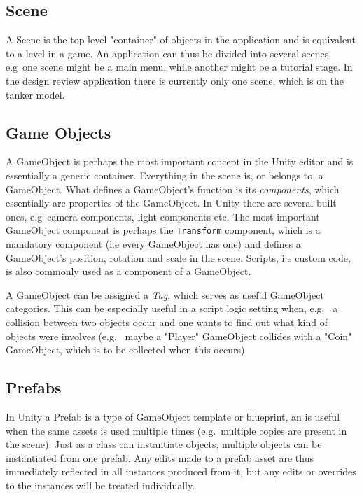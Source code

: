 \subsection{Scene}
A Scene is the top level "container" of objects in the application and is equivalent to a level in a game. 
An application can thus be divided into several scenes, e.g~one scene might be a main menu, while another might be a tutorial stage.
In the design review application there is currently only one scene, which is on the tanker model.

\subsection{Game Objects}
A GameObject is perhaps the most important concept in the Unity editor and is essentially a generic container.
Everything in the scene is, or belongs to, a GameObject. What defines a GameObject's function is its \textit{components}, 
which essentially are properties of the GameObject. In Unity there are several built ones, e.g~camera components,
light components etc. 
The most important GameObject component is perhaps the \texttt{Transform} component, which is a mandatory component (i.e every GameObject has one) and 
defines a GameObject's position, rotation and scale in the scene. Scripts, i.e custom code, is also commonly used as a component of 
a GameObject.

A GameObject can be assigned a \textit{Tag}, which serves as useful GameObject categories. This can be especially useful in a script logic setting when, e.g.~
a collision between two objects occur and one wants to find out what kind of objects were involves (e.g.~ maybe a "Player" GameObject collides with a "Coin" GameObject, which
is to be collected when this occurs).   

\subsection{Prefabs}
In Unity a Prefab is a type of GameObject template or blueprint, an is useful when the same assets is used multiple times (e.g.~multiple copies are present in the scene). 
Just as a class can instantiate objects, multiple objects can be instantiated from one prefab.
Any edits made to a prefab asset are thus immediately reflected in all instances produced from it, but any edits or overrides to the instances will be treated individually.




